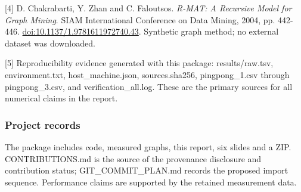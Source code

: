 \documentclass[11pt,a4paper]{article}
\begin{document}
[4] D. Chakrabarti, Y. Zhan and C. Faloutsos. \emph{R-MAT: A Recursive Model for Graph Mining}. SIAM International Conference on Data Mining, 2004, pp. 442-446. \href{https://doi.org/10.1137/1.9781611972740.43}{doi:10.1137/\allowbreak{}1.9781611972740.43}. Synthetic graph method; no external dataset was downloaded.


[5] Reproducibility evidence generated with this package: results/\allowbreak{}raw.tsv, environment.txt, host\_\allowbreak{}machine.json, sources.sha256, pingpong\_\allowbreak{}1.csv through pingpong\_\allowbreak{}3.csv, and verification\_\allowbreak{}all.log. These are the primary sources for all numerical claims in the report.


\subsubsection*{Project records}

The package includes code, measured graphs, this report, six slides and a ZIP. CONTRIBUTIONS.md is the source of the provenance disclosure and contribution status; GIT\_\allowbreak{}COMMIT\_\allowbreak{}PLAN.md records the proposed import sequence. Performance claims are supported by the retained measurement data.


\FloatBarrier
\end{document}
